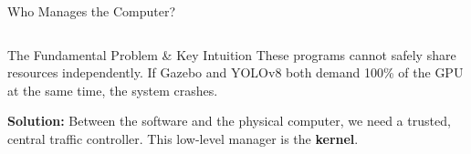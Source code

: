 \begin{frame}{Who Manages the Computer?}
\begin{columns}[T]
\end{columns}

\pause
\vspace{0.2cm}

\begin{alertblock}{The Fundamental Problem \& Key Intuition}
    These programs cannot safely share resources independently. If Gazebo and YOLOv8 both demand 100\% of the GPU at the same time, the system crashes. 
    
    \vspace{0.15cm}
    \textbf{Solution:} Between the software and the physical computer, we need a trusted, central traffic controller. This low-level manager is the \textbf{kernel}.
\end{alertblock}

\end{frame}


